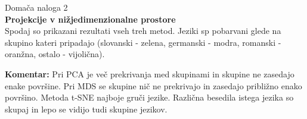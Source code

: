 \documentclass[11pt,a4paper]{article}
\begin{document}
{\huge Domača naloga 2} \\
{\Huge \textbf{Projekcije v nižjedimenzionalne prostore}} \\


Spodaj so prikazani rezultati vseh treh metod. Jeziki sp pobarvani glede na 
skupino kateri pripadajo (slovanski - zelena, germanski - modra, romanski - oranžna, ostalo - vijolična).

\textbf{Komentar:} 
Pri PCA je več prekrivanja med skupinami in skupine ne zasedajo enake površine. Pri MDS
se skupine nič ne prekrivajo in zasedajo približno enako površino. Metoda t-SNE najboje 
gruči jezike. Različna besedila istega jezika so skupaj in lepo se vidijo tudi skupine jezikov.
\begin{center}
	\resizebox*{!}{23em}{}
\end{center}
\begin{center}
	\resizebox*{!}{23em}{}
\end{center}
\begin{center}
	\resizebox*{!}{23em}{}
\end{center}
\end{document}
